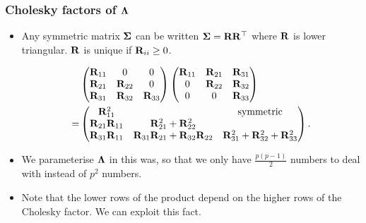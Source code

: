 \documentclass{beamer}
\begin{document}
\begin{frame}
	\frametitle{Cholesky factors of ${\boldsymbol \Lambda}$}
	\begin{itemize}
			\item Any symmetric matrix ${\boldsymbol \Sigma}$ can be written ${\boldsymbol \Sigma} = {\bf R} {\bf R}^\top$
			where ${\bf R}$ is lower triangular. ${\bf R}$ is unique if ${\bf R}_{ii} \geq 0$.
			
			\begin{align*}
				&\begin{pmatrix}
				{\bf R}_{11}          & 0                                    & 0                                     \\
				{\bf R}_{21}          & {\bf R}_{22}                             & 0                                     \\
				{\bf R}_{31}          & {\bf R}_{32}                             & {\bf R}_{33}                              
				\end{pmatrix}
				\begin{pmatrix}
				{\bf R}_{11}          & {\bf R}_{21}                             & {\bf R}_{31}                              \\
				0                 & {\bf R}_{22}                             & {\bf R}_{32}                              \\
				0                 & 0                                    & {\bf R}_{33}                              
				\end{pmatrix}
				\\
				=& \begin{pmatrix}
				{\bf R}_{11}^2        &                                      & \text{symmetric}                      \\
				{\bf R}_{21}{\bf R}_{11} & {\bf R}_{21}^2 + {\bf R}_{22}^2 \\
				{\bf R}_{31} {\bf R}_{11} & {\bf R}_{31}{\bf R}_{21} + {\bf R}_{32} {\bf R}_{22} & {\bf R}_{31}^2 + {\bf R}_{32} ^2 + {\bf R}_{33}^2 
				\end{pmatrix}.
			\end{align*}
			
			\item We parameterise ${\boldsymbol \Lambda}$ in this was, so that we only have $\frac{p(p-1)}{2}$ numbers to deal with 						instead of $p^2$ numbers.
			\item Note that the lower rows of the product depend on the higher rows of the Cholesky factor. We can
						exploit this fact.
		\end{itemize}	
\end{frame}
\end{document}
